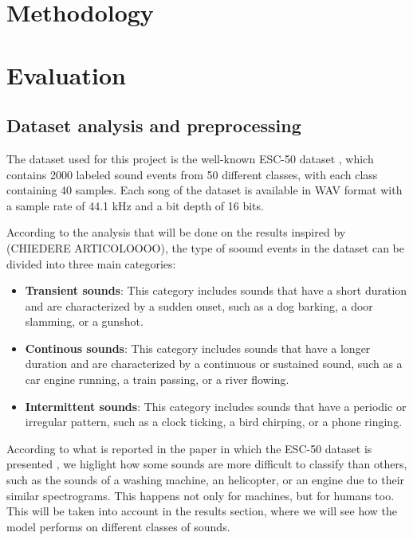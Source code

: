 \documentclass{article}
\begin{document}
\begin{sloppy}
\section{Methodology}
\label{sec:methodology}


\section{Evaluation}
\label{sec:evaluation}

\subsection{Dataset analysis and preprocessing}
\label{sec:format}

The dataset used for this project is the well-known ESC-50 dataset \cite{piczak2015dataset}, which contains
2000 labeled sound events from 50 different classes, with each class containing 40 samples. Each song of the dataset is available in WAV format with
a sample rate of 44.1 kHz and a bit depth of 16 bits.

According to the analysis that will be done on the results inspired by (CHIEDERE ARTICOLOOOO), the type of soound events in the dataset can be divided into three main categories:
\begin{itemize}
    \item \textbf{Transient sounds}: This category includes sounds that have a short duration and are characterized by a sudden onset, such as a dog barking, a door slamming, or a gunshot.
    \item \textbf{Continous sounds}: This category includes sounds that have a longer duration and are characterized by a continuous or sustained sound, such as a car engine running, a train passing, or a river flowing.
    \item \textbf{Intermittent sounds}: This category includes sounds that have a periodic or irregular pattern, such as a clock ticking, a bird chirping, or a phone ringing.
\end{itemize}

According to what is reported in the paper in which the ESC-50 dataset is presented \cite{piczak2015dataset}, we higlight how some sounds are more difficult to classify than others,
such as the sounds of a washing machine, an helicopter, or an engine due to their similar spectrograms.
This happens not only for machines, but for humans too. This will be taken into account in the results section, where we will see how the model performs on different classes of sounds.


\end{sloppy}
\end{document}
